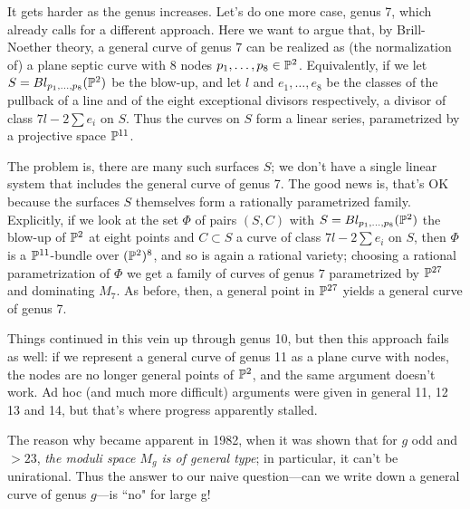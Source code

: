 It gets harder as the genus increases. Let's do one more case, genus 7, which already calls for a different approach. Here we want to argue that, by Brill-Noether theory, a general curve of genus $7$ can be realized as (the normalization of) a plane septic curve with 8 nodes $p_1,\dots,p_8 \in {\mathbb P}^2$. Equivalently, if we let $S = Bl_{p_1,\dots,p_8}({\mathbb P}^2)$ be the blow-up, and let $l$ and $e_1,\dots,e_8$ be the classes of the pullback of a line and of the eight exceptional divisors respectively, a divisor of class $7l - 2 \sum e_i$ on $S$. Thus the curves on $S$ form a linear series, parametrized by a projective space ${\mathbb P}^{11}$.

The problem is, there are many such surfaces $S$; we don't have a single linear system that includes the general curve of genus 7. The good news is, that's OK because the surfaces $S$ themselves form a rationally parametrized family. Explicitly, if we look at the set $\Phi$ of pairs $(S, C)$ with $S = Bl_{p_1,\dots,p_8}({\mathbb P}^2)$  the blow-up of ${\mathbb P}^2$ at eight points and $C \subset S$ a curve of class $7l - 2 \sum e_i$ on $S$, then $\Phi$ is a ${\mathbb P}^{11}$-bundle over $({\mathbb P}^2)^8$, and so is again a rational variety; choosing a rational parametrization of $\Phi$ we get a family of curves of genus $7$ parametrized by ${\mathbb P}^{27}$ and dominating $M_7$. As before, then, a general point in ${\mathbb P}^{27}$ yields a general curve of genus 7.

Things continued in this vein up through genus 10, but then this approach fails as well: if we represent a general curve of genus 11 as a plane curve with nodes, the nodes are no longer general points of ${\mathbb P}^2$, and the same argument doesn't work. Ad hoc (and much more difficult) arguments were given in general 11, 12 13 and 14, but that's where progress apparently stalled.

The reason why became apparent in 1982, when it was shown that for $g$ odd and $>23$, \emph{the moduli space $M_g$ is of general type}; in particular, it can't be unirational. Thus the answer to our naive question---can we write down a general curve of genus $g$---is ``no" for large g!



